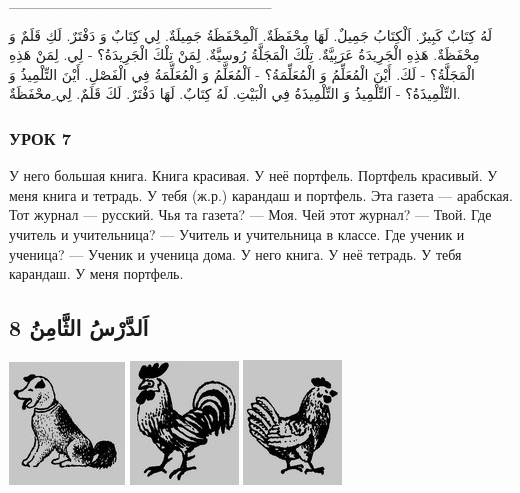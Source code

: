 \documentclass[a5paper]{article}
\begin{document}
\_\_\_\_\_\_\_\_\_\_\_\_\_\_\_\_\_\_\_\_\_\_\_\_\_

لَهُ كِتَابٌ كَبِيرٌ. اَلْكِتَابُ جَمِيلٌ. لَهَا مِحْفَظَةٌ. اَلْمِحْفَظَةُ جَمِيلَةٌ. لِي كِتَابٌ وَ دَفْتَرٌ. لَكِ قَلَمٌ وَ مِحْفَظَةٌ. هَذِهِ الْجَرِيدَةُ عَرَبِيَّةٌ. تِلْكَ الْمَجَلَّةُ رُوسِيَّةٌ. لِمَنْ تِلْكَ الْجَرِيدَةُ؟ - لِي. لِمَنْ هَذِهِ الْمَجَلَّةُ؟ - لَكَ. أَيْنَ الْمُعَلِّمُ وَ الْمُعَلِّمَةُ؟ - اَلْمُعَلِّمُ وَ الْمُعَلِّمَةُ فِي الْفَصْلِ. أَيْنَ التِّلْمِيذُ وَ التِّلْمِيذَةُ؟ - اَلتِّلْمِيذُ وَ التِّلْمِيذَةُ فِي الْبَيْتِ. لَهُ كِتَابٌ. لَهَا دَفْتَرٌ. لَكَ قَلَمٌ. لِي ِمحْفَظَةٌ.

\subsubsection{УРОК 7}
У него большая книга. Книга красивая. У неё портфель. Портфель красивый. У меня книга и тетрадь. У тебя (ж.р.) карандаш и портфель. Эта газета — арабская. Тот журнал — русский. Чья та газета? — Моя. Чей этот журнал? — Твой. Где учитель и учительница? — Учитель и учительница в классе. Где ученик и ученица? — Ученик и ученица дома. У него книга. У неё тетрадь. У тебя карандаш. У меня портфель.

\subsection{8 اَلدَّرْسُ الثَّامِنُ}
 \includegraphics[width=1.2083in,height=1.2811in]{MuhammadBagauddinlatinized-img011.jpg}   \includegraphics[width=1.1354in,height=1.2917in]{MuhammadBagauddinlatinized-img012.jpg}   \includegraphics[width=1.0311in,height=1.302in]{MuhammadBagauddinlatinized-img013.jpg} 
\end{document}
